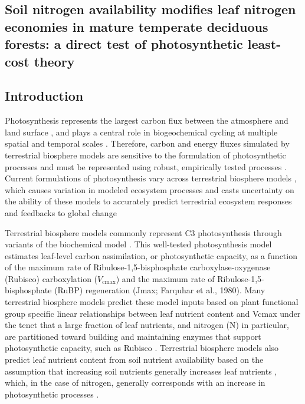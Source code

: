 \begin{singlespace}
    \chapter{\textbf{Soil nitrogen availability modifies leaf nitrogen economies in mature temperate deciduous forests: a direct test of photosynthetic least-cost theory}}
    \end{singlespace}
    
    \section{Introduction}

    Photosynthesis represents the largest carbon flux between the atmosphere and land surface , and plays a central role in biogeochemical cycling at multiple spatial and temporal scales . Therefore, carbon and energy fluxes simulated by terrestrial biosphere models are sensitive to the formulation of photosynthetic processes  and must be represented using robust, empirically tested processes . Current formulations of photosynthesis vary across terrestrial biosphere models , which causes variation in modeled ecosystem processes  and casts uncertainty on the ability of these models to accurately predict terrestrial ecosystem responses and feedbacks to global change   

    Terrestrial biosphere models commonly represent C3 photosynthesis through variants of the  biochemical model . This well-tested photosynthesis model estimates leaf-level carbon assimilation, or photosynthetic capacity, as a function of the maximum rate of Ribulose-1,5-bisphosphate carboxylase-oxygenase (Rubisco) carboxylation ($V_{\mathrm{cmax}}$) and the maximum rate of Ribulose-1,5-bisphosphate (RuBP) regeneration (Jmax; Farquhar et al., 1980). Many terrestrial biosphere models predict these model inputs based on plant functional group specific linear relationships between leaf nutrient content and Vcmax  under the tenet that a large fraction of leaf nutrients, and nitrogen (N) in particular, are partitioned toward building and maintaining enzymes that support photosynthetic capacity, such as Rubisco . Terrestrial biosphere models also predict leaf nutrient content from soil nutrient availability based on the assumption that increasing soil nutrients generally increases leaf nutrients , which, in the case of nitrogen, generally corresponds with an increase in photosynthetic processes .

